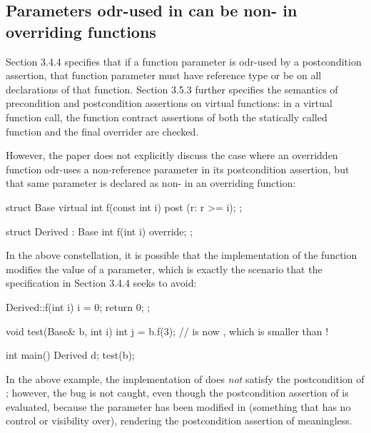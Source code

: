\subsection{Parameters odr-used in  can be non- in overriding functions}

\cite{P2900R10} Section 3.4.4 specifies that if a function parameter is odr-used by a postcondition assertion, that function parameter must have reference type or be  on all declarations of that function. \cite{P2900R10} Section 3.5.3 further specifies the semantics of precondition and postcondition assertions on virtual functions: in a virtual function call, the function contract assertions of both the statically called function and the final overrider are checked.

However, the paper does not explicitly discuss the case where an overridden function odr-uses a  non-reference parameter in its postcondition assertion, but that same parameter is declared as non- in an overriding function:
\begin{codeblock}
struct Base {
  virtual int f(const int i) post (r: r >= i);
};

struct Derived : Base {
  int f(int i) override;
};
\end{codeblock}
In the above constellation, it is possible that the implementation of the function modifies the value of a  parameter, which is exactly the scenario that the specification in \cite{P2900R10} Section 3.4.4 seeks to avoid:
\begin{codeblock}
Derived::f(int i) {
  i = 0;
  return 0;
};

void test(Base& b, int i) {
  int j = b.f(3);
  //  is now , which is smaller than !
}

int main() {
  Derived d;
  test(b);
}
\end{codeblock}
In the above example, the implementation of  does \emph{not} satisfy the postcondition of ; however, the bug is not caught, even though the postcondition assertion of  is evaluated, because the parameter  has been modified in  (something that  has no control or visibility over), rendering the postcondition assertion of  meaningless.

